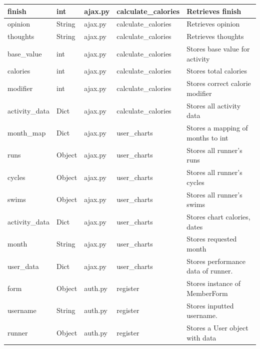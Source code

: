 \documentclass{article}[12pt,a4paper]
\begin{document}
\begin{longtable}{|l|l|l|l|l|}
finish            & int         & ajax.py        & calculate\_calories & Retrieves finish                    \\ \hline
opinion           & String      & ajax.py        & calculate\_calories & Retrieves opinion                   \\ \hline
thoughts          & String      & ajax.py        & calculate\_calories & Retrieves thoughts                  \\ \hline
base\_value       & int         & ajax.py        & calculate\_calories & Stores base value for activity      \\ \hline
calories          & int         & ajax.py        & calculate\_calories & Stores total calories               \\ \hline
modifier          & int         & ajax.py        & calculate\_calories & Stores correct calorie modifier     \\ \hline
activity\_data    & Dict        & ajax.py        & calculate\_calories & Stores all activity data            \\ \hline
month\_map        & Dict        & ajax.py        & user\_charts        & Stores a mapping of months to int       \\ \hline
runs              & Object      & ajax.py        & user\_charts        & Stores all runner's runs              \\ \hline
cycles            & Object      & ajax.py        & user\_charts        & Stores all runner's cycles            \\ \hline
swims             & Object      & ajax.py        & user\_charts        & Stores all runner's swims             \\ \hline
activity\_data    & Dict        & ajax.py        & user\_charts        & Stores chart calories, dates    \\ \hline
month             & String      & ajax.py        & user\_charts        & Stores requested month              \\ \hline
user\_data        & Dict        & ajax.py        & user\_charts        & Stores performance data of runner.    \\ \hline
form              & Object      & auth.py        & register            & Stores instance of MemberForm     \\ \hline
username          & String      & auth.py        & register            & Stores inputted username.           \\ \hline
runner              & Object      & auth.py        & register            & Stores a User object with data          \\ \hline

\end{longtable}
\end{document}
